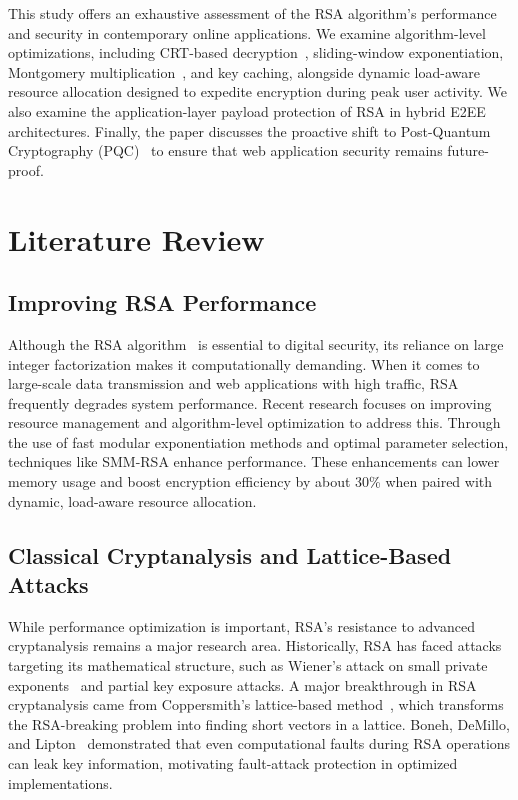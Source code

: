 \documentclass[journal]{IEEEtran}
\begin{document}
This study offers an exhaustive assessment of the RSA algorithm's performance and security in contemporary online applications. We examine algorithm-level optimizations, including CRT-based decryption~\cite{garner1959}, sliding-window exponentiation, Montgomery multiplication~\cite{montgomery1985}, and key caching, alongside dynamic load-aware resource allocation designed to expedite encryption during peak user activity. We also examine the application-layer payload protection of RSA in hybrid E2EE architectures. Finally, the paper discusses the proactive shift to Post-Quantum Cryptography (PQC)~\cite{nist2024} to ensure that web application security remains future-proof.


\section{Literature Review}
\label{sec:litreview}

\subsection{Improving RSA Performance}

Although the RSA algorithm~\cite{rivest1978} is essential to digital security, its reliance on large integer factorization makes it computationally demanding. When it comes to large-scale data transmission and web applications with high traffic, RSA frequently degrades system performance. Recent research focuses on improving resource management and algorithm-level optimization to address this. Through the use of fast modular exponentiation methods and optimal parameter selection, techniques like SMM-RSA enhance performance. These enhancements can lower memory usage and boost encryption efficiency by about 30\% when paired with dynamic, load-aware resource allocation.

\subsection{Classical Cryptanalysis and Lattice-Based Attacks}

While performance optimization is important, RSA's resistance to advanced cryptanalysis remains a major research area. Historically, RSA has faced attacks targeting its mathematical structure, such as Wiener's attack on small private exponents~\cite{wiener1990} and partial key exposure attacks. A major breakthrough in RSA cryptanalysis came from Coppersmith's lattice-based method~\cite{coppersmith1997}, which transforms the RSA-breaking problem into finding short vectors in a lattice. Boneh, DeMillo, and Lipton~\cite{boneh2001} demonstrated that even computational faults during RSA operations can leak key information, motivating fault-attack protection in optimized implementations.
\end{document}
